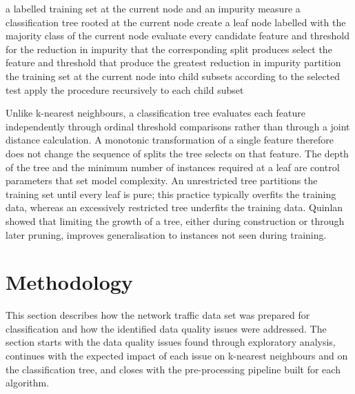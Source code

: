\documentclass[10pt,conference]{IEEEtran}
\begin{document}
\begin{algorithm}
\caption{Recursive construction of a classification tree}
\label{alg:tree}
\begin{algorithmic}[1]
\Require a labelled training set at the current node and an impurity measure
\Ensure a classification tree rooted at the current node
    \State create a leaf node labelled with the majority class of the current node
\Else
    \State evaluate every candidate feature and threshold for the reduction in impurity that the corresponding split produces
    \State select the feature and threshold that produce the greatest reduction in impurity
    \State partition the training set at the current node into child subsets according to the selected test
    \State apply the procedure recursively to each child subset
\EndIf
\end{algorithmic}
\end{algorithm}

Unlike k-nearest neighbours, a classification tree evaluates each feature independently through ordinal threshold comparisons rather than through a joint distance calculation. A monotonic transformation of a single feature therefore does not change the sequence of splits the tree selects on that feature. The depth of the tree and the minimum number of instances required at a leaf are control parameters that set model complexity. An unrestricted tree partitions the training set until every leaf is pure; this practice typically overfits the training data, whereas an excessively restricted tree underfits the training data. Quinlan~\cite{quinlan1986} showed that limiting the growth of a tree, either during construction or through later pruning, improves generalisation to instances not seen during training.

\section{Methodology}
\label{sec:methodology}

This section describes how the network traffic data set was prepared for classification and how the identified data quality issues were addressed. The section starts with the data quality issues found through exploratory analysis, continues with the expected impact of each issue on k-nearest neighbours and on the classification tree, and closes with the pre-processing pipeline built for each algorithm.
\end{document}
